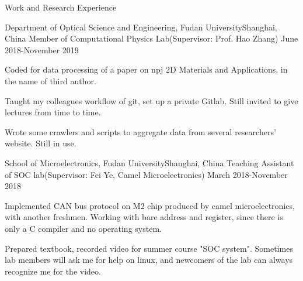 \documentclass{resume} %
\begin{document}
\begin{rSection}{Work and Research Experience}

\begin{rSubsection}
{Department of Optical Science and Engineering, Fudan University}{Shanghai, China}
{Member of Computational Physics Lab(Supervisor: Prof. Hao Zhang)}
{June 2018-November 2019}

\item Coded for data processing of a paper on npj 2D Materials and Applications, in the name of third author.
\item Taught my colleagues workflow of git, set up a private Gitlab. Still invited to give lectures from time to time.
\item Wrote some crawlers and scripts to aggregate data from several researchers' website. Still in use.


\end{rSubsection}



\begin{rSubsection}
{School of Microelectronics, Fudan University}{Shanghai, China}
{Teaching Assistant of SOC lab(Supervisor: Fei Ye, Camel Microelectronics)}
{March 2018-November 2018}

\item Implemented CAN bus protocol on M2 chip produced by camel microelectronics, with another freshmen. Working with bare address and register, since there is only a C compiler and no operating system.
\item Prepared textbook, recorded video for summer course "SOC system". Sometimes lab members will ask me for help on linux, and newcomers of the lab can always recognize me for the video.
 
\end{rSubsection}



\end{rSection}


\end{document}
